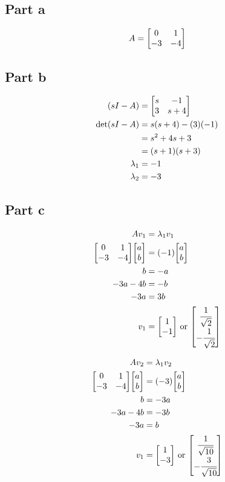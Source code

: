 \documentclass[]{article}
\begin{document}
\subsection{Part a}
\begin{displaymath}
	A = \mqty[0&1\\-3&-4]
\end{displaymath}

\subsection{Part b}

\begin{align*}
	(sI - A)
	&= \mqty[s & -1\\ 3 & s+4]\\
	\det(sI-A)
	&= s(s+4) - (3)(-1)\\
	&= s^2 + 4s + 3\\
	&= (s + 1) (s + 3)\\
	\lambda_1
	&= -1\\
	\lambda_2
	&= -3
\end{align*}

\subsection{Part c}

\begin{align*}
	A v_1
	&= \lambda_1 v_1\\
	\mqty[0&1\\-3&-4] \mqty[a\\b]
	&= (-1) \mqty[a\\b]\\
	b &= -a\\
	-3 a - 4 b &= -b\\
	-3a &= 3b\\
	v_1 &= \mqty[1\\ -1] \text{ or }  \mqty[\cfrac{1}{\sqrt{2}}\\ -\cfrac{1}{\sqrt{2}}]
\end{align*}


\begin{align*}
	A v_2
	&= \lambda_1 v_2\\
	\mqty[0&1\\-3&-4] \mqty[a\\b]
	&= (-3) \mqty[a\\b]\\
	b &= -3a\\
	-3 a - 4 b &= -3b\\
	-3a &= b\\
	v_1 &= \mqty[1\\ -3] \text{ or } \mqty[\cfrac{1}{\sqrt{10}}\\ -\cfrac{3}{\sqrt{10}}]
\end{align*}
\end{document}
